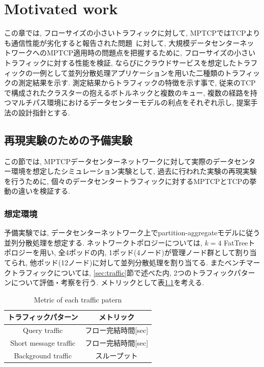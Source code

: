\chapter{Motivated work}
\label{chapter:motivated_work}
この章では, フローサイズの小さいトラフィックに対して,
MPTCPではTCPよりも通信性能が劣化すると報告された問題~\cite{improving}に対して,
大規模データセンターネットワークへのMPTCP適用時の問題点を把握するために, フローサイズの小さいトラフィックに対する性能を検証, 
ならびにクラウドサービスを想定したトラフィックの一例として並列分散処理アプリケーションを用いた二種類のトラフィックの測定結果を示す.
測定結果からトラフィックの特徴を示す事で, 従来のTCPで構成されたクラスターの抱えるボトルネックと複数のキュー,
複数の経路を持つマルチパス環境におけるデータセンターモデルの利点をそれぞれ示し, 提案手法の設計指針とする.

\section{再現実験のための予備実験}
\label{sec:reevaluation}
この節では, MPTCPデータセンターネットワークに対して実際のデータセンター環境を想定したシミュレーション実験として,
過去に行われた実験\cite{improving}の再現実験を行うために, 個々のデータセンタートラフィックに対するMPTCPとTCPの挙動の違いを検証する. 

\subsection{想定環境}
予備実験では, データセンターネットワーク上でpartition-aggregateモデルに従う並列分散処理を想定する.
ネットワークトポロジーについては, $k=4$ FatTreeトポロジーを用い,
全4ポッドの内, 1ポッド(4ノード)が管理ノード群として割り当てられ, 他ポッド(12ノード)に対して並列分散処理を割り当てる. 
またベンチマークトラフィックについては, \ref{sec:traffic}節で述べた内, 2つのトラフィックパターンについて評価・考察を行う.
メトリックとして表\ref{metric}を考える.

\begin{table}[t]
\begin{center}
\caption{Metric of each traffic patern}
\begin{tabular}{c|c}
\hline
トラフィックパターン & メトリック \\ \hline \hline
Query traffic & フロー完結時間[sec] \\
Short message traffic & フロー完結時間[sec] \\
Background traffic & スループット \\
\hline
\end{tabular}
\label{metric}
\end{center}
\end{table}

